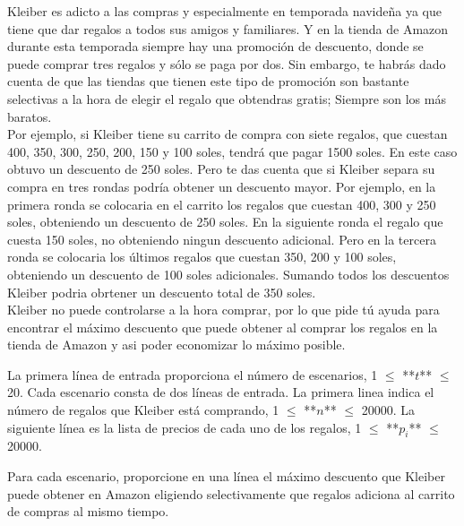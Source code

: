 
Kleiber es adicto a las compras y especialmente en temporada navideña ya que tiene que dar regalos a todos sus amigos y familiares. Y en la tienda de Amazon durante esta temporada siempre hay una promoción de descuento, donde se puede comprar tres regalos y sólo se paga por dos. Sin embargo, te habrás dado cuenta de que las tiendas que tienen este tipo de promoción son bastante selectivas a la hora de elegir el regalo que obtendras gratis; Siempre son los más baratos.
\\
Por ejemplo, si Kleiber tiene su carrito de compra con siete regalos, que cuestan 400, 350, 300, 250, 200, 150 y 100 soles, tendrá que pagar 1500 soles. En este caso obtuvo un descuento de 250 soles. Pero te das cuenta que si Kleiber separa su compra en tres rondas podría obtener un descuento mayor. Por ejemplo, en la primera ronda se colocaria en el carrito los regalos que cuestan 400, 300 y 250 soles, obteniendo un descuento de 250 soles. En la siguiente ronda el regalo que cuesta 150 soles, no obteniendo ningun descuento adicional. Pero en la tercera ronda se colocaria los últimos regalos que cuestan 350, 200 y 100 soles, obteniendo un descuento de 100 soles adicionales. Sumando todos los descuentos Kleiber podria obrtener un descuento total de 350 soles.
\\
Kleiber no puede controlarse a la hora comprar, por lo que pide tú ayuda para encontrar el máximo descuento que puede obtener al comprar los regalos en la tienda de Amazon y asi poder economizar lo máximo posible.


La primera línea de entrada proporciona el número de escenarios, 1 $\leq$ **$t$** $\leq$ 20. Cada escenario consta de dos líneas de entrada. La primera linea indica el número de regalos que Kleiber está comprando, 1 $\leq$ **$n$** $\leq$ 20000. La siguiente línea es la lista de precios de cada uno de los regalos, 1 $\leq$ **$p_i$** $\leq$ 20000.

\outputText

Para cada escenario, proporcione en una línea el máximo descuento que Kleiber puede obtener en Amazon eligiendo selectivamente que regalos adiciona al carrito de compras al mismo tiempo.

\exampleCases

\begin{example}
\end{example}
